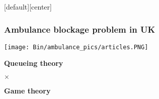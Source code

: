 [default][center]


\begin{frame}
    \frametitle{Ambulance blockage problem in UK}
    \centering

    \texttt{[image: Bin/ambulance\_pics/articles.PNG]}
        
\end{frame}



\begin{frame}
    \Huge
    \centering

    \textbf{Queueing theory}

    \(\times\)

    \textbf{Game theory}
    
\end{frame}
